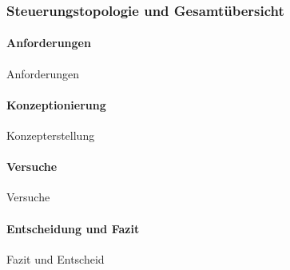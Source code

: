 \documentclass[main.tex]{subfiles} %
\begin{document}

\subsubsection{Steuerungstopologie und Gesamtübersicht}

\paragraph{Anforderungen}
Anforderungen

\paragraph{Konzeptionierung}
Konzepterstellung

\paragraph{Versuche}
Versuche

\paragraph{Entscheidung und Fazit}
Fazit und Entscheid
\end{document}
